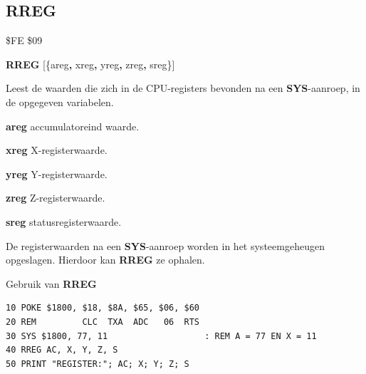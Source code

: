 \subsection{RREG}
\begin{description}[leftmargin=2cm,style=nextline]
\item [Token:]    \$FE \$09

\item [Formaat:]   {\bf RREG} [\{areg{\bf,} xreg{\bf,} yreg{\bf,} zreg{\bf,} sreg\}]

\item [Gebruik:]    Leest de waarden die zich in de CPU-registers bevonden na een {\bf SYS}-aanroep, in de opgegeven variabelen.

                  {\bf areg} accumulatoreind waarde.

                  {\bf xreg} X-registerwaarde.

                  {\bf yreg} Y-registerwaarde.

                  {\bf zreg} Z-registerwaarde.

                  {\bf sreg} statusregisterwaarde.

\item [Opmerkingen:]  De registerwaarden na een {\bf SYS}-aanroep worden in het systeemgeheugen opgeslagen. Hierdoor kan {\bf RREG} ze ophalen.

\item [Voorbeeld:]  Gebruik van {\bf RREG}
\begin{tcolorbox}[colback=black,coltext=white]
\verbatimfont{\codefont}
\begin{verbatim}
10 POKE $1800, $18, $8A, $65, $06, $60
20 REM         CLC  TXA  ADC   06  RTS
30 SYS $1800, 77, 11                   : REM A = 77 EN X = 11
40 RREG AC, X, Y, Z, S
50 PRINT "REGISTER:"; AC; X; Y; Z; S
\end{verbatim}
\end{tcolorbox}
\end{description}


\newpage
